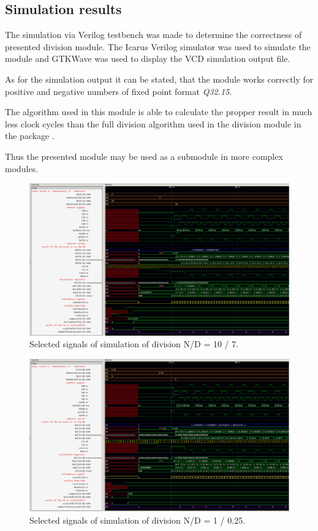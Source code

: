 \documentclass[a4paper, twoside, 11pt]{article}
\begin{document}
\subsection{Simulation results}
The simulation via Verilog testbench was made to determine the correctness of presented division module. The Icarus Verilog simulator was used to simulate the module and GTKWave was used to display the VCD simulation output file.\par
As for the simulation output it can be stated, that the module works correctly for positive and negative numbers of fixed point format \textit{Q32.15}.\par
The algorithm used in this module is able to calculate the propper result in much less clock cycles than the full division algorithm used in the division module in the package \cite{burke-fixed-point-math-library}.\par
Thus the presented module may be used as a submodule in more complex modules.\par


\begin{figure}[htbp!]
  \centering
  \includegraphics[width=1\textwidth]{src/png/division-10-div-7.png}
   \caption{Selected signals of simulation of division N/D = 10 / 7.}
  \label{fig:division-10-div-7}
\end{figure}


\begin{figure}[htbp!]
  \centering
  \includegraphics[width=1\textwidth]{src/png/division-1-div-0-25.png}
   \caption{Selected signals of simulation of division N/D = 1 / 0.25.}
  \label{fig:division-1-div-0-25}
\end{figure}
\end{document}
